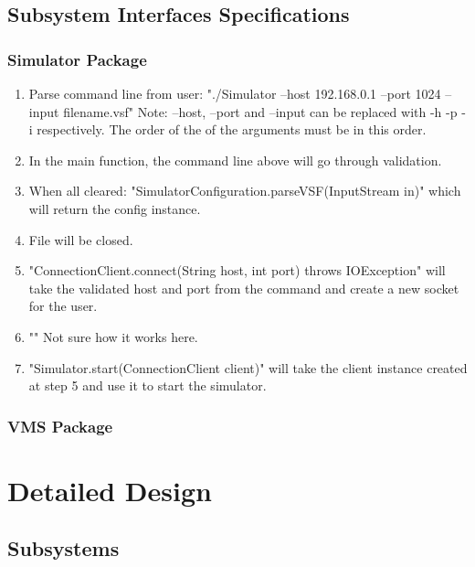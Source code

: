 \documentclass{article}
\begin{document}
\subsection{Subsystem Interfaces Specifications}

\subsubsection{Simulator Package}

\begin{enumerate}
  \item Parse command line from user: 
		\newline "./Simulator --host 192.168.0.1 --port 1024 --input filename.vsf"
		\newline Note: --host, --port and --input can be replaced with -h -p -i respectively.
		\newline The order of the of the arguments must be in this order.
  \item In the main function, the command line above will go through validation.
  \item When all cleared: "SimulatorConfiguration.parseVSF(InputStream in)"
		\newline which will return the config instance.
  \item File will be closed.
	\item "ConnectionClient.connect(String host, int port) throws IOException" will take the validated host and port from the command and create a new socket for the user.
	\item "" Not sure how it works here.
	\item "Simulator.start(ConnectionClient client)" will take the client instance created at step 5 and use it to start the simulator.	
\end{enumerate}

\subsubsection{VMS Package}


\section{Detailed Design}

\subsection{Subsystems}
\end{document}
